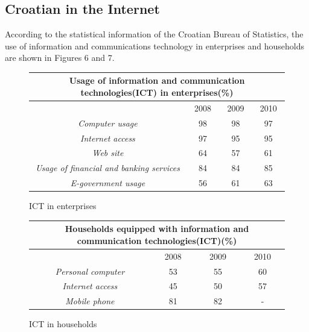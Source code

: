 \begin{multicols}{2}
\subsection{Croatian in the Internet}

According to the statistical information of the Croatian Bureau of Statistics, the use of information and communications technology in enterprises and households are shown in Figures 6 and 7.

\begin{figure}[htb]
\centering
    \begin{tabular}{|c|c|c|c|}
        \hline
      \multicolumn{4}{|c|}{\textbf{Usage of information and communication technologies(ICT) in enterprises(\%)}} \\ \hline
        ~                                              & 2008 & 2009 & 2010 \\ \hline
        \emph{Computer usage}                        & 98   & 98   & 97   \\ \hline
        \emph{Internet access}                       & 97   & 95   & 95   \\ \hline
        \emph{Web site}                            & 64   & 57   & 61   \\ \hline
        \emph{Usage of financial and banking services} & 84   & 84   & 85   \\ \hline
        \emph{E-government usage}                 & 56   & 61   & 63   \\
        \hline
   \end{tabular}
  \caption{ICT in enterprises}
  \label{fig:IST_pod_en}
\end{figure}

\begin{figure}[htb]
\centering
	\begin{tabular}{|c|c|c|c|}
        \hline
      \multicolumn{4}{|c|}{\textbf{Households equipped with information and communication technologies(ICT)(\%)}} \\ \hline
        ~                                              & 2008 & 2009 & 2010 \\ \hline
        \emph{Personal computer}   & 53   & 55   & 60   \\ \hline
        \emph{Internet access} & 45   & 50   & 57   \\ \hline
        \emph{Mobile phone}   & 81   & 82   & -    \\
        \hline
   \end{tabular}
  \caption{ICT in households}
  \label{fig:IST_kuc_en}
\end{figure}


\end{multicols}
